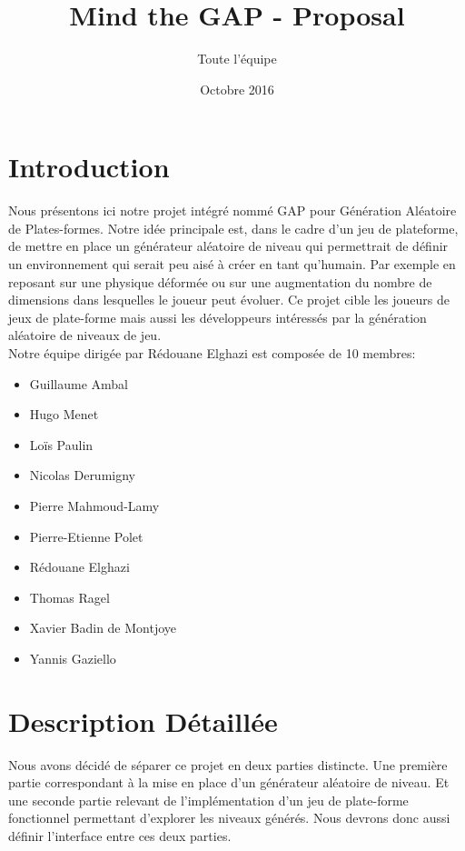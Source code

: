 \documentclass[12pt]{article}
\title{Mind the GAP - Proposal}
\author{Toute l'équipe}
\date{Octobre 2016}
\begin{document}
\maketitle

\section{Introduction}
    Nous présentons ici notre projet intégré nommé GAP pour Génération Aléatoire de Plates-formes. Notre idée principale est, dans le cadre d'un jeu de plateforme, de mettre en place un générateur aléatoire de niveau qui permettrait de définir un environnement qui serait peu aisé à créer en tant qu'humain. Par exemple en reposant sur une physique déformée ou sur une augmentation du nombre de dimensions dans lesquelles le joueur peut évoluer. Ce projet cible les joueurs de jeux de plate-forme mais aussi les développeurs intéressés par la génération aléatoire de niveaux de jeu. \\
    Notre équipe dirigée par Rédouane Elghazi est composée de 10 membres:
    \begin{itemize}
        \renewcommand{\labelitemi}{$\bullet$}
        \item Guillaume Ambal
        \item Hugo Menet
        \item Loïs Paulin
        \item Nicolas Derumigny
        \item Pierre Mahmoud-Lamy
        \item Pierre-Etienne Polet
        \item Rédouane Elghazi
        \item Thomas Ragel
        \item Xavier Badin de Montjoye
        \item Yannis Gaziello
    \end{itemize}
    
\clearpage
\section{Description Détaillée}

    Nous avons décidé de séparer ce projet en deux parties distincte. Une première partie correspondant à la mise en place d'un générateur aléatoire de niveau. Et une seconde partie relevant de l'implémentation d'un jeu de plate-forme fonctionnel permettant d'explorer les niveaux générés. Nous devrons donc aussi définir l'interface entre ces deux parties.
    
\end{document}

